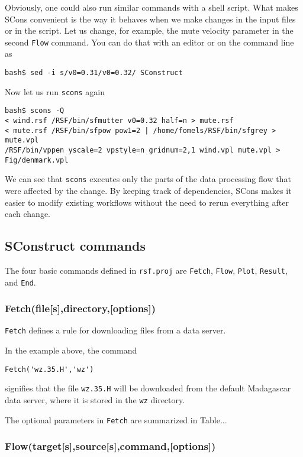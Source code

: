 Obviously, one could also run similar commands with a shell script. What makes SCons convenient is the way it behaves when we make changes in the input files or in the script. Let us change, for example, the mute velocity parameter in the second \texttt{Flow} command. You can do that with an editor or on the command line as

\begin{verbatim}
bash$ sed -i s/v0=0.31/v0=0.32/ SConstruct
\end{verbatim}

Now let us run \texttt{scons} again

\begin{verbatim}
bash$ scons -Q
< wind.rsf /RSF/bin/sfmutter v0=0.32 half=n > mute.rsf
< mute.rsf /RSF/bin/sfpow pow1=2 | /home/fomels/RSF/bin/sfgrey > mute.vpl
/RSF/bin/vppen yscale=2 vpstyle=n gridnum=2,1 wind.vpl mute.vpl > Fig/denmark.vpl
\end{verbatim}

We can see that \texttt{scons} executes only the parts of the data
processing flow that were affected by the change. By keeping track of
dependencies, SCons makes it easier to modify existing workflows
without the need to rerun everything after each change.

\subsection{SConstruct commands}

The four basic commands defined in \texttt{rsf.proj} are \texttt{Fetch}, \texttt{Flow}, \texttt{Plot}, \texttt{Result}, and \texttt{End}.

\subsubsection{Fetch(file[s],directory,[options])}

\texttt{Fetch} defines a rule for downloading files from a data server.

In the example above, the command
\begin{lstlisting}
Fetch('wz.35.H','wz')
\end{lstlisting}
signifies that the file \texttt{wz.35.H} will be downloaded from the default Madagascar data server, where it is stored in the \texttt{wz} directory.

The optional parameters in \texttt{Fetch} are summarized in Table...


\subsubsection{Flow(target[s],source[s],command,[options])}
